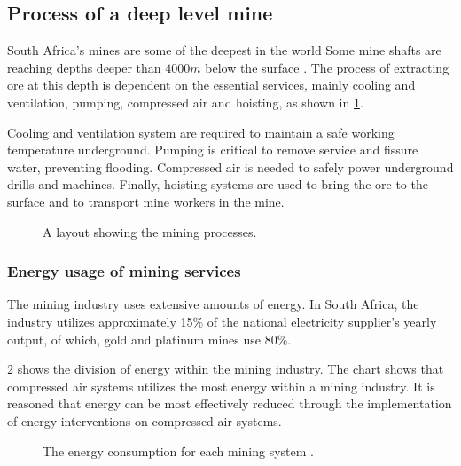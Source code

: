 	\subsection{Process of a deep level mine}
	South Africa's mines are some of the deepest in the world Some mine shafts are reaching depths deeper than $4000m$ below the surface \cite{vosloo2012case}. The process of extracting ore at this depth is dependent on the essential services, mainly cooling and ventilation, pumping, compressed air and hoisting, as shown in \cref{fig: Mining Layout}.
	\par 
	 Cooling and ventilation system are required to maintain a safe working temperature underground. Pumping is critical to remove service and fissure water, preventing flooding. Compressed air is needed to safely power underground drills and machines. Finally, hoisting systems are used to bring the ore to the surface and to transport mine workers in the mine. 
		\begin{figure}[h!]
			\centering
			\caption{A layout showing the mining processes.}
			\label{fig: Mining Layout}
		\end{figure}
		\subsubsection{Energy usage of mining services}
			The mining industry uses extensive amounts of energy. In South Africa, the industry utilizes approximately 15\% of the national electricity supplier's yearly output, of which, gold and platinum mines use 80\%.\cite{Eskom2010Energy}
			\par
			 \cref{fig: Energy Split} shows the division of energy within the mining industry. The chart shows that compressed air systems utilizes the most energy within a mining industry. It is reasoned that energy can be most effectively reduced through the implementation of energy interventions on compressed air systems.
			\begin{figure}[h]
				\centering
				\fbox{}
				\caption[The energy consumption for each mining system.]{The energy consumption for each mining system \cite{le2005energy}.}
				\label{fig: Energy Split}
			\end{figure}
